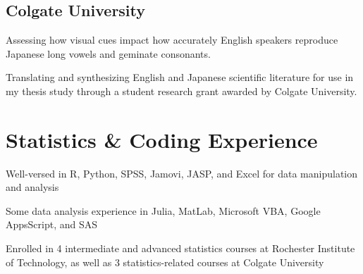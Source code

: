 \documentclass[letterpaper]{deedy-resume} %
\begin{document}
\subsection{Colgate University}
\begin{tightitemize}
\item Assessing how visual cues impact how accurately English speakers reproduce Japanese long vowels and geminate consonants.
\end{tightitemize}
\sectionspace %
\begin{tightitemize}
\item Translating and synthesizing English and Japanese scientific literature for use in my thesis study through a student research grant awarded by Colgate University.
\end{tightitemize}
\sectionspace %

\section{Statistics \& Coding Experience}
\begin{tightitemize}
\item Well-versed in R, Python, SPSS, Jamovi, JASP, and Excel for data manipulation and analysis
\item Some data analysis experience in Julia, MatLab, Microsoft VBA, Google AppsScript, and SAS
\item Enrolled in 4 intermediate and advanced statistics courses at Rochester Institute of Technology, as well as 3 statistics-related courses at Colgate University
\end{tightitemize}
\sectionspace %

\end{document}
